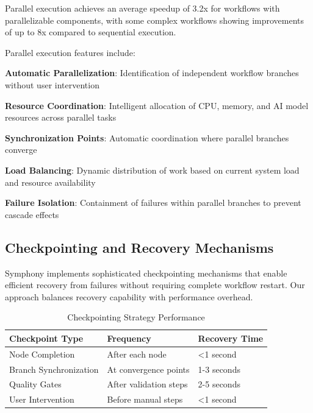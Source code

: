 \begin{alertbox}
Parallel execution achieves an average speedup of 3.2x for workflows with parallelizable components, with some complex workflows showing improvements of up to 8x compared to sequential execution.
\end{alertbox}

Parallel execution features include:

\begin{expandedlist}
    \item \textbf{Automatic Parallelization}: Identification of independent workflow branches without user intervention
    \item \textbf{Resource Coordination}: Intelligent allocation of CPU, memory, and AI model resources across parallel tasks
    \item \textbf{Synchronization Points}: Automatic coordination where parallel branches converge
    \item \textbf{Load Balancing}: Dynamic distribution of work based on current system load and resource availability
    \item \textbf{Failure Isolation}: Containment of failures within parallel branches to prevent cascade effects
\end{expandedlist}

\subsection*{Checkpointing and Recovery Mechanisms}

Symphony implements sophisticated checkpointing mechanisms that enable efficient recovery from failures without requiring complete workflow restart. Our approach balances recovery capability with performance overhead.

\begin{table}[ht]
\centering
\begin{tabular}{@{}lll@{}}
\toprule
\textbf{Checkpoint Type} & \textbf{Frequency} & \textbf{Recovery Time} \\
\midrule
Node Completion & After each node & <1 second \\
Branch Synchronization & At convergence points & 1-3 seconds \\
Quality Gates & After validation steps & 2-5 seconds \\
User Intervention & Before manual steps & <1 second \\
\bottomrule
\end{tabular}
\caption{Checkpointing Strategy Performance}
\end{table}

